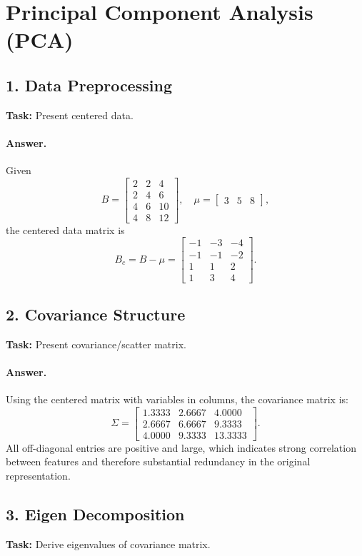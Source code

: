 \section{Principal Component Analysis (PCA)}

\subsection{1. Data Preprocessing}
\textbf{Task:} Present centered data.

\paragraph{Answer.}
Given
\[
B=\begin{bmatrix}
2 & 2 & 4\\
2 & 4 & 6\\
4 & 6 & 10\\
4 & 8 & 12
\end{bmatrix},
\quad
\mu=\begin{bmatrix}3 & 5 & 8\end{bmatrix},
\]
the centered data matrix is
\[
B_c=B-\mu=
\begin{bmatrix}
-1 & -3 & -4\\
-1 & -1 & -2\\
 1 &  1 &  2\\
 1 &  3 &  4
\end{bmatrix}.
\]

\subsection{2. Covariance Structure}
\textbf{Task:} Present covariance/scatter matrix.

\paragraph{Answer.}
Using the centered matrix with variables in columns, the covariance matrix is:
\[
\Sigma=
\begin{bmatrix}
1.3333 & 2.6667 & 4.0000\\
2.6667 & 6.6667 & 9.3333\\
4.0000 & 9.3333 & 13.3333
\end{bmatrix}.
\]
All off-diagonal entries are positive and large, which indicates strong correlation between features and therefore substantial redundancy in the original representation.

\subsection{3. Eigen Decomposition}
\textbf{Task:} Derive eigenvalues of covariance matrix.

